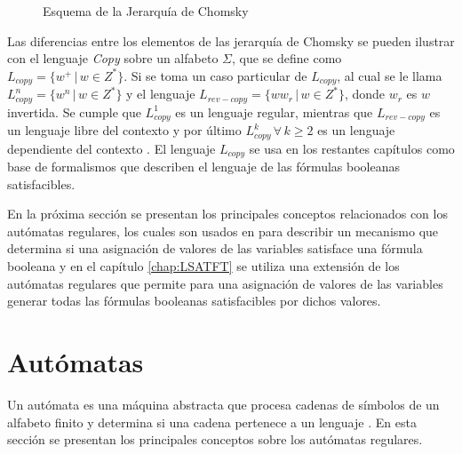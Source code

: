 \documentclass[12pt]{article}
\begin{document}
\begin{figure}
  \centering
  \caption{Esquema de la Jerarquía de Chomsky}
  \label{fig:ChomskySchema} %
\end{figure}

Las diferencias entre los elementos de las jerarquía de Chomsky se pueden ilustrar con el lenguaje \textit{Copy} sobre un alfabeto 
$\Sigma$, que se define como $L_{copy}=\{w^+\,|\,w\in Z^*\}$.  
Si se toma un caso particular de $L_{copy}$, al cual se le llama $L_{copy}^n=\{w^n\,|\,w\in Z^*\}$ y 
el lenguaje $L_{rev-copy}=\{ww_r\,|\,w\in Z^*\}$, donde $w_r$ es $w$ invertida. Se cumple que $L_{copy}^1$
es un lenguaje regular, mientras que $L_{rev-copy}$ es un lenguaje libre del contexto y por último 
$L_{copy}^k\,\forall\,k\geq 2$ es un lenguaje dependiente del contexto \cite{authomataTheory}.  
El lenguaje $L_{copy}$ se usa en los restantes capítulos como base de formalismos que describen el 
lenguaje de las fórmulas booleanas satisfacibles.

En la próxima sección se presentan los principales conceptos relacionados con los autómatas regulares,
los cuales son usados en \cite{aCFSAT} para describir un mecanismo que determina si una asignación
de valores de las variables satisface una fórmula booleana y en el capítulo \ref{chap:LSATFT} se utiliza una extensión
de los autómatas regulares que permite para una asignación de valores de las variables generar todas las fórmulas
booleanas satisfacibles por dichos valores.

\section{Autómatas}
Un autómata es una máquina abstracta que procesa cadenas de símbolos de un alfabeto finito y determina si una 
cadena pertenece a un lenguaje \cite{authomataTheory}.  En esta sección se presentan los 
principales conceptos sobre los autómatas regulares.
\end{document}

